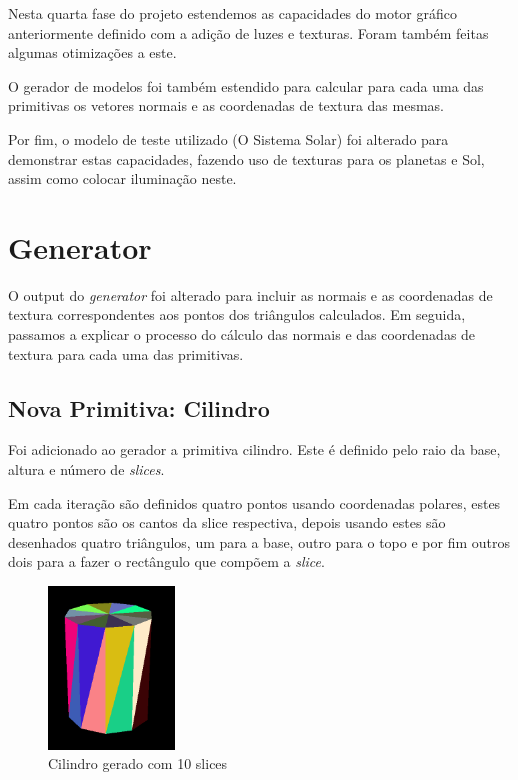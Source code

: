 \documentclass[a4paper]{article}
\begin{document}
Nesta quarta fase do projeto estendemos as capacidades do motor gráfico
anteriormente definido com a adição de luzes e texturas. Foram também feitas
algumas otimizações a este.

O gerador de modelos foi também estendido para calcular para cada uma das
primitivas os vetores normais e as coordenadas de textura das mesmas.

Por fim, o modelo de teste utilizado (O Sistema Solar) foi alterado para
demonstrar estas capacidades, fazendo uso de texturas para os planetas e Sol,
assim como colocar iluminação neste.


\section{Generator}

O output do \textit{generator} foi alterado para incluir as normais e as
coordenadas de textura correspondentes aos pontos dos triângulos calculados.
Em seguida, passamos a explicar o processo do cálculo das normais e das
coordenadas de textura para cada uma das primitivas.

\subsection{Nova Primitiva: Cilindro}

Foi adicionado ao gerador a primitiva cilindro. Este é definido pelo raio da
base, altura e número de \textit{slices}.

Em cada iteração são definidos quatro pontos usando coordenadas polares, estes
quatro pontos são os cantos da slice respectiva, depois usando estes são
desenhados quatro triângulos, um para a base, outro para o topo e por fim
outros dois para a fazer o rectângulo que compõem a \textit{slice}.

\begin{figure}[H]
    \centering
    \includegraphics[width=0.3\textwidth]{cylinder_colored.png}
    \caption{Cilindro gerado com 10 slices}
\end{figure}
\end{document}
